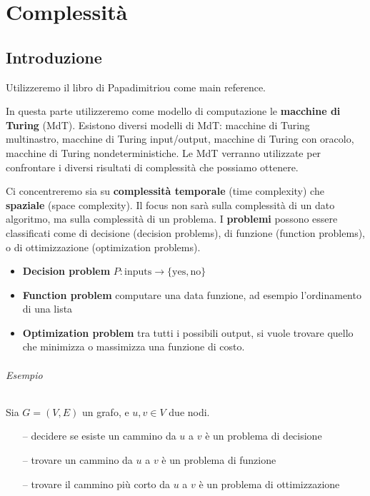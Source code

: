\part{Complessità}


\chapter{Introduzione}

Utilizzeremo il libro di Papadimitriou come main reference.

In questa parte utilizzeremo come modello di computazione le \textbf{macchine di Turing} (MdT). Esistono diversi modelli di MdT: macchine di Turing multinastro, macchine di Turing input/output, macchine di Turing con oracolo, macchine di Turing nondeterministiche. Le MdT verranno utilizzate per confrontare i diversi risultati di complessità che possiamo ottenere.

Ci concentreremo sia su \textbf{complessità temporale} (time complexity) che \textbf{spaziale} (space complexity). Il focus non sarà sulla complessità di un dato algoritmo, ma sulla complessità di un problema. I \textbf{problemi} possono essere classificati come di decisione (decision problems), di funzione (function problems), o di ottimizzazione (optimization problems).
\begin{itemize}
    \item \textbf{Decision problem} $P:\text{inputs}\to\{\text{yes},\text{no}\}$
    \item \textbf{Function problem} computare una data funzione, ad esempio l'ordinamento di una lista
    \item \textbf{Optimization problem} tra tutti i possibili output, si vuole trovare quello che minimizza o massimizza una funzione di costo. 
\end{itemize}

\paragraph{Esempio} Sia $G=(V,E)$ un grafo, e $u,v\in V$ due nodi. 
\begin{itemize}
    \item[--] decidere se esiste un cammino da $u$ a $v$ è un problema di decisione
    \item[--] trovare un cammino da $u$ a $v$ è un problema di funzione
    \item[--] trovare il cammino più corto da $u$ a $v$ è un problema di ottimizzazione
\end{itemize}

